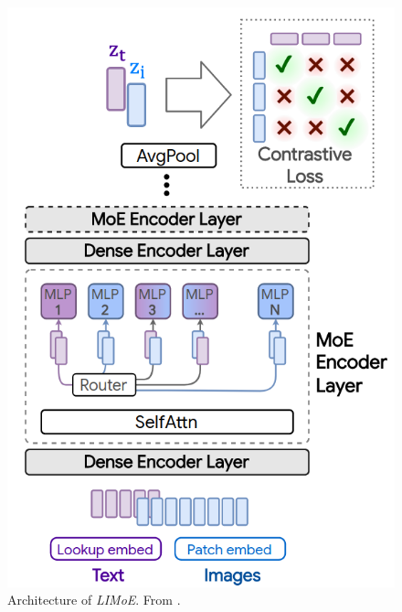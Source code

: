 \documentclass[
]{krantz}
\begin{document}
\begin{figure}

{\centering \includegraphics[width=0.8\linewidth]{figures/03-03-multipurpose/LIMoE} 

}

\caption{Architecture of \emph{LIMoE}. From \citet{Mustafa2022}.}\label{fig:LIMoE}
\end{figure}
\end{document}

